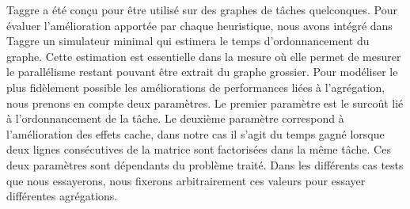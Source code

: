 Taggre a été conçu pour être utilisé sur des graphes de tâches quelconques.
%
Pour évaluer l'amélioration apportée par chaque heuristique, nous avons intégré dans Taggre un simulateur minimal qui estimera le temps d'ordonnancement du graphe.
%
Cette estimation est essentielle dans la mesure où elle permet de mesurer le parallélisme restant pouvant être extrait du graphe grossier.
%
Pour modéliser le plus fidèlement possible les améliorations de performances liées à l'agrégation, nous prenons en compte deux paramètres.
%
Le premier paramètre est le surcoût lié à l'ordonnancement de la tâche.
%
Le deuxième paramètre correspond à l'amélioration des effets cache, dans notre cas il s'agit du temps gagné lorsque deux lignes consécutives de la matrice sont factorisées dans la même tâche.
%
Ces deux paramètres sont dépendants du problème traité.
%
Dans les différents cas tests que nous essayerons, nous fixerons arbitrairement ces valeurs pour essayer différentes agrégations.
